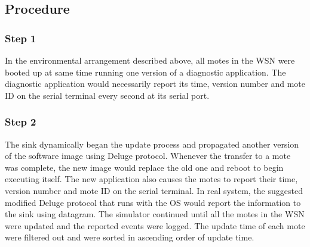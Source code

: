 \documentclass[conference,final]{IEEEtran}
\begin{document}
\subsection*{Procedure}
\label{subsec:proc}
%
%
%
\subsubsection*{Step 1} 
In the environmental arrangement described above, all motes in the WSN were booted up at same time running one version of a diagnostic application. 
The diagnostic application would necessarily report its time, version number and mote ID on the serial terminal every second at its serial port. 


\subsubsection*{Step 2} 
The sink dynamically began the update process and propagated another version of the software image using Deluge protocol. %
Whenever the transfer to a mote was complete, the new image would replace the old one and reboot to begin executing itself.
The  new application also causes the motes to report their time, version number and mote ID on the serial terminal. 
In real system, the suggested modified Deluge protocol that runs with the OS would report the information to the sink using datagram.
The simulator continued until all the motes in the WSN were updated and the reported events were logged. 
The update time of each mote were filtered out  and were sorted in ascending order of update time.

\end{document}
